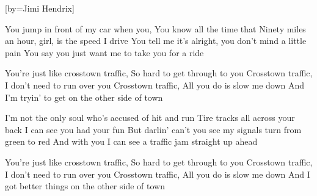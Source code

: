 

[by=Jimi Hendrix]


\beginverse
You jump in front of my car when you,
You know all the time that
Ninety miles an hour, girl, is the speed I drive
You tell me it's alright, you don't mind a little pain
You say you just want me to take you for a ride
\endverse

\beginchorus
You're just like crosstown traffic, So hard to get through to you
Crosstown traffic, I don't need to run over you
Crosstown traffic, All you do is slow me down
And I'm tryin' to get on the other side of town
\endchorus

\beginverse
I'm not the only soul who's accused of hit and run
Tire tracks all across your back
I can see you had your fun
But darlin' can't you see my signals turn from green to red
And with you I can see a traffic jam straight up ahead
\endverse

\beginchorus
You're just like crosstown traffic, So hard to get through to you
Crosstown traffic, I don't need to run over you
Crosstown traffic, All you do is slow me down
And I got better things on the other side of town
\endchorus



\chordson
\endsong
